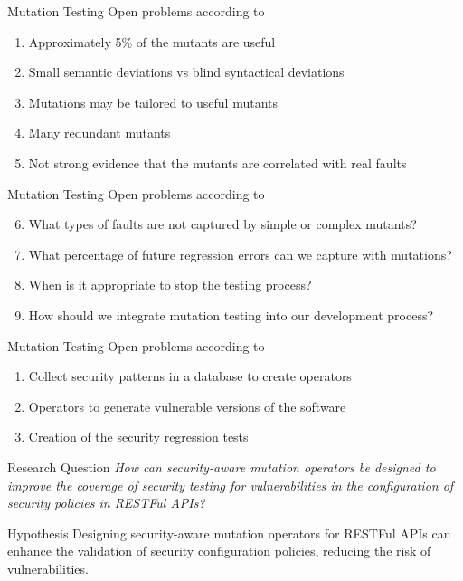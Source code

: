 \documentclass[12pt]{beamer}
\theoremstyle{remark}
\theoremstyle{definition}
\begin{document}
\begin{frame}{Mutation Testing}
Open problems according to \cite{Papadakis2019}
\begin{enumerate}
    \item Approximately 5\% of the mutants are useful
    \item Small semantic deviations vs blind syntactical deviations
    \item Mutations may be tailored to useful mutants
    \item Many redundant mutants
    \item Not strong evidence that the mutants are correlated with real faults
\end{enumerate}
\end{frame}

\begin{frame}{Mutation Testing}
Open problems according to \cite{Papadakis2019}
\begin{enumerate}
    \setcounter{enumi}{5}
    \item What types of faults are not captured by simple or complex mutants? 
    \item What percentage of future regression errors can we capture with mutations? 
    \item When is it appropriate to stop the testing process? 
    \item How should we integrate mutation testing into our development process?
\end{enumerate}
\end{frame}

\begin{frame}{Mutation Testing}
Open problems according to \cite{Loise2017}
\begin{enumerate}
    \item Collect security patterns in a database to create operators
    \item Operators to generate vulnerable versions of the software
    \item Creation of the security regression tests
\end{enumerate}
\end{frame}

\begin{frame}[allowframebreaks]
\begin{block}{Research Question}
\textit{How can security-aware mutation operators be designed to improve the coverage of security testing for vulnerabilities in the configuration of security policies in RESTFul APIs?}
\end{block}

\begin{block}{Hypothesis}
Designing security-aware mutation operators for RESTFul APIs can enhance the validation of security configuration policies, reducing the risk of vulnerabilities.
\end{block}
\end{frame}
\end{document}
